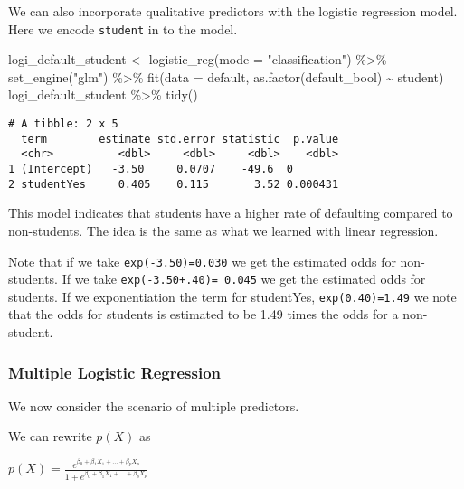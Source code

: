 \documentclass[
]{article}
\newenvironment{Shaded}{\begin{snugshade}}{\end{snugshade}}
\newcommand{\AttributeTok}[1]{\textcolor[rgb]{0.77,0.63,0.00}{#1}}
\newcommand{\FunctionTok}[1]{\textcolor[rgb]{0.00,0.00,0.00}{#1}}
\newcommand{\NormalTok}[1]{#1}
\newcommand{\OtherTok}[1]{\textcolor[rgb]{0.56,0.35,0.01}{#1}}
\newcommand{\SpecialCharTok}[1]{\textcolor[rgb]{0.00,0.00,0.00}{#1}}
\newcommand{\StringTok}[1]{\textcolor[rgb]{0.31,0.60,0.02}{#1}}
\begin{document}
We can also incorporate qualitative predictors with the logistic
regression model. Here we encode \texttt{student} in to the model.

\begin{Shaded}
\begin{Highlighting}[]
\NormalTok{logi\_default\_student }\OtherTok{\textless{}{-}} 
  \FunctionTok{logistic\_reg}\NormalTok{(}\AttributeTok{mode =} \StringTok{"classification"}\NormalTok{) }\SpecialCharTok{\%\textgreater{}\%}
  \FunctionTok{set\_engine}\NormalTok{(}\StringTok{"glm"}\NormalTok{) }\SpecialCharTok{\%\textgreater{}\%}
  \FunctionTok{fit}\NormalTok{(}\AttributeTok{data =}\NormalTok{ default, }\FunctionTok{as.factor}\NormalTok{(default\_bool) }\SpecialCharTok{\textasciitilde{}}\NormalTok{ student)}
\NormalTok{logi\_default\_student }\SpecialCharTok{\%\textgreater{}\%} \FunctionTok{tidy}\NormalTok{()}
\end{Highlighting}
\end{Shaded}

\begin{verbatim}
# A tibble: 2 x 5
  term        estimate std.error statistic  p.value
  <chr>          <dbl>     <dbl>     <dbl>    <dbl>
1 (Intercept)   -3.50     0.0707    -49.6  0       
2 studentYes     0.405    0.115       3.52 0.000431
\end{verbatim}

This model indicates that students have a higher rate of defaulting
compared to non-students. The idea is the same as what we learned with
linear regression.

Note that if we take \texttt{exp(-3.50)=0.030} we get the estimated odds
for non-students. If we take \texttt{exp(-3.50+.40)=\ 0.045} we get the
estimated odds for students. If we exponentiation the term for
studentYes, \texttt{exp(0.40)=1.49} we note that the odds for students
is estimated to be 1.49 times the odds for a non-student.

\hypertarget{multiple-logistic-regression}{%
\subsubsection{Multiple Logistic
Regression}\label{multiple-logistic-regression}}

We now consider the scenario of multiple predictors.

We can rewrite \(p(X)\) as

\(p(X) = \frac{e^{\beta_0+\beta_1X_1+...+\beta_pX_p}}{1+e^{\beta_0+\beta_1X_1+...+\beta_pX_p}}\)
\end{document}
